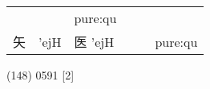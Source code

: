 \documentclass[14pt,a4paper]{scrartcl}
\begin{document}
\begin{longtable}[c]{@{}llllll@{}}
\begin{minipage}[t]{0.14\columnwidth}\raggedright\strut
\strut\end{minipage} &
\begin{minipage}[t]{0.14\columnwidth}\raggedright\strut
\strut\end{minipage} &
\begin{minipage}[t]{0.14\columnwidth}\raggedright\strut
pure:qu
\strut\end{minipage}\tabularnewline
\begin{minipage}[t]{0.14\columnwidth}\raggedright\strut
矢
\strut\end{minipage} &
\begin{minipage}[t]{0.14\columnwidth}\raggedright\strut
'ejH
\strut\end{minipage} &
\begin{minipage}[t]{0.14\columnwidth}\raggedright\strut
医 'ejH
\strut\end{minipage} &
\begin{minipage}[t]{0.14\columnwidth}\raggedright\strut
\strut\end{minipage} &
\begin{minipage}[t]{0.14\columnwidth}\raggedright\strut
\strut\end{minipage} &
\begin{minipage}[t]{0.14\columnwidth}\raggedright\strut
pure:qu
\strut\end{minipage}\tabularnewline
\bottomrule
\end{longtable}

(148) 0591 {[}2{]}
\end{document}
